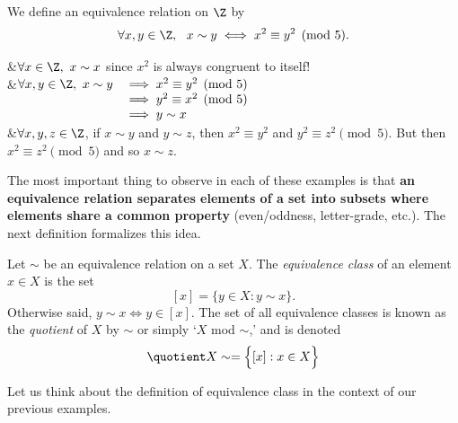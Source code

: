 \begin{examples}
	\item We define an equivalence relation on $\Z$ by
	\[\forall x,y\in\Z,\ \ x\sim y\iff x^2\equiv y^2\pmod 5.\]
		\begin{eptabular}{\trans}
		&$\forall x\in\Z,\ x\sim x$ since $x^2$ is always congruent to itself!\\
		\symm&$\begin{array}[t]{@{}rl}
		\forall x,y\in\Z,\ x\sim y&\implies x^2\equiv y^2\pmod 5\\
		&\implies y^2\equiv x^2\pmod 5\\
		&\implies y\sim x
		\end{array}$\\
		\trans&$\forall x,y,z\in\Z$, if $x\sim y$ and $y\sim z$, then $x^2\equiv y^2$ and $y^2\equiv z^2\pmod 5$. But then $x^2\equiv z^2\pmod 5$ and so $x\sim z$.
	\end{eptabular}
\end{examples}

\noindent The most important thing to observe in each of these examples is that {\bf an equivalence relation separates elements of a set into subsets where elements share a common property} (even/oddness, letter-grade, etc.). The next definition formalizes this idea.

\begin{defn}\label{defn:equivrel}
Let $\sim$ be an equivalence relation on a set $X$. The \emph{equivalence class} of an element $x\in X$ is the set
\[[x]=\{y\in X:y\sim x\}.\]
Otherwise said, $y\sim x\iff y\in[x]$. The set of all equivalence classes is known as the \emph{quotient} of $X$ by $\sim$ or simply `$X$ mod $\sim$,' and is denoted
\[\quotient X\sim=\Big\{[x]:x\in X\Big\}\]
\end{defn}

\noindent Let us think about the definition of equivalence class in the context of our previous examples.

